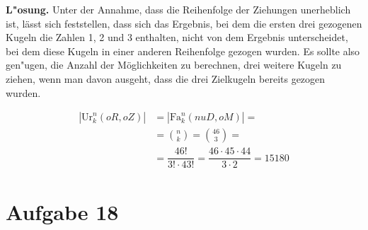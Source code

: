 \documentclass[10pt, oneside]{article}
\begin{document}
\textbf{L"osung.} Unter der Annahme, dass die Reihenfolge der Ziehungen unerheblich ist, lässt
sich feststellen, dass sich das Ergebnis, bei dem die ersten drei gezogenen
Kugeln die Zahlen 1, 2 und 3 enthalten, nicht von dem Ergebnis unterscheidet,
bei dem diese Kugeln in einer anderen Reihenfolge gezogen wurden. Es sollte
also gen"ugen, die Anzahl der Möglichkeiten zu berechnen, drei weitere
Kugeln zu ziehen, wenn man davon ausgeht, dass die drei Zielkugeln bereits
gezogen wurden.

\begin{equation*}
    \begin{aligned}
        |\text{Ur}^n_k(oR, oZ)| &= |\text{Fa}^n_k(nuD, oM)| = \\[5pt]
                                &= \binom{n}{k} = \binom{46}{3} = \\[5pt]
                                &= \dfrac{46!}{3!\cdot43!} = \dfrac{46 \cdot 45 \cdot 44}{3 \cdot 2} = 15180
    \end{aligned}
\end{equation*}

\pagebreak
\section{Aufgabe 18}
\end{document}

